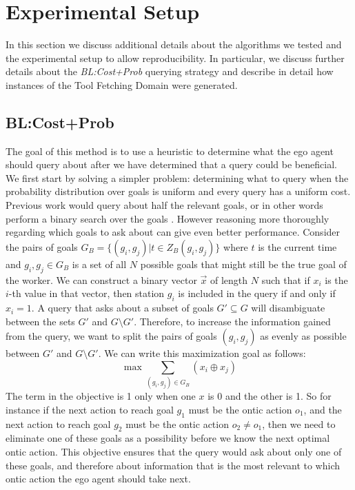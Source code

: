 \documentclass[letterpaper]{article}
\begin{document}
\section{Experimental Setup}
\label{app:exp}

In this section we discuss additional details about the algorithms we tested and the experimental setup to allow reproducibility. In particular, we discuss further details about the \emph{BL:Cost+Prob} querying strategy and describe in detail how instances of the Tool Fetching Domain were generated.

\subsection{BL:Cost+Prob}
The goal of this method is to use a heuristic to determine what the ego agent should query about after we have determined that a query could be beneficial.
We first start by solving a simpler problem: determining what to query when the probability distribution over goals is uniform and every query has a uniform cost. Previous work would query about half the relevant goals, or in other words perform a binary search over the goals \cite{mirskypenny}. However reasoning more thoroughly regarding which goals to ask about can give even better performance. Consider the pairs of goals $G_B = \{(g_i,g_j) | t \in Z_B(g_i, g_j)\}$ where $t$ is the current time and $g_i, g_j \in G_B$ is a set of all $N$ possible goals that might still be the true goal of the worker. 
We can construct a binary vector $\vec{x}$ of length $N$ such that if $x_i$ is the $i$-th value in that vector, then station $g_i$ is included in the query if and only if $x_i=1$. A query that asks about a subset of goals $G'\subseteq G$ will disambiguate between the sets $G'$ and $G\setminus G'$. Therefore, to increase the information gained from the query, we want to split the pairs of goals $(g_i, g_j)$ as evenly as possible between $G'$ and $G\setminus G'$. We can write this maximization goal as follows:
\begin{equation}
    \max\sum\limits_{(g_i, g_j) \in G_B}(x_i \oplus x_j)
    \label{eq:o1}
\end{equation}
The term in the objective is 1 only when one $x$ is 0 and the other is 1. So for instance if the next action to reach goal $g_1$ must be the ontic action $o_1$, and the next action to reach goal $g_2$ must be the ontic action $o_2 \neq o_1$, then we need to eliminate one of these goals as a possibility before we know the next optimal ontic action.
This objective ensures that the query would ask about only one of these goals, and therefore about information that is the most relevant to which ontic action the ego agent should take next.
\end{document}
